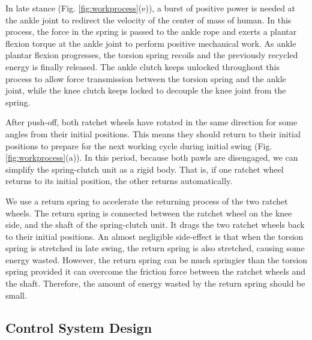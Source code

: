 \documentclass[twocolumn,cleanfoot,10pt]{asme2ej}
\begin{document}
In late stance (Fig. \ref{fig:workprocess}(e)), a burst of positive power is needed at the ankle joint to redirect the velocity of the center of mass of human.
In this process, the force in the spring is passed to the ankle rope and exerts a plantar flexion torque at the ankle joint to perform positive mechanical work.
As ankle plantar flexion progresses, the torsion spring recoils and the previously recycled energy is finally released.
The ankle clutch keeps unlocked throughout this process to allow force transmission between the torsion spring and the ankle joint, while the knee clutch keeps locked to decouple the knee joint from the spring.

After push-off, both ratchet wheels have rotated in the same direction for some angles from their initial positions.
This means they should return to their initial positions to prepare for the next working cycle during initial swing (Fig. \ref{fig:workprocess}(a)).
In this period, because both pawls are disengaged, we can simplify the spring-clutch unit as a rigid body.
That is, if one ratchet wheel returns to its initial position, the other returns automatically.

We use a return spring to accelerate the returning process of the two ratchet wheels.
The return spring is connected between the ratchet wheel on the knee side, and the shaft of the spring-clutch unit.
It drags the two ratchet wheels back to their initial positions.
An almost negligible side-effect is that when the torsion spring is stretched in late swing, the return spring is also stretched, causing some energy wasted.
However, the return spring can be much springier than the torsion spring provided it can overcome the friction force between the ratchet wheels and the shaft.
Therefore, the amount of energy wasted by the return spring should be small. 


\subsection{Control System Design}
\end{document}
